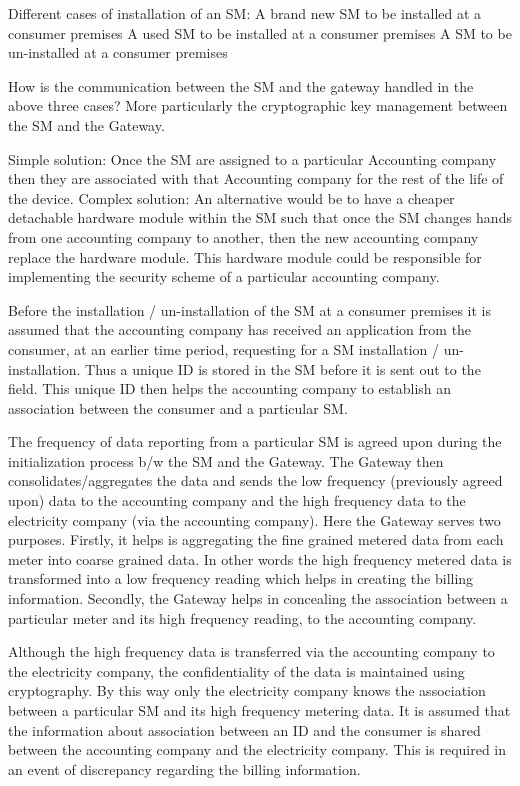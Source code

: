 Different cases of installation of an SM:
A brand new SM to be installed at a consumer premises
A used SM to be installed at a consumer premises
A SM to be un-installed at a consumer premises


How is the communication between the SM and the gateway handled in the above three cases? More particularly the cryptographic key management between the SM and the Gateway.

Simple solution: Once the SM are assigned to a particular Accounting company then they are associated with that Accounting company for the rest of the life of the device.
Complex solution: An alternative would be to have a cheaper detachable hardware module within the SM such that once the SM changes hands from one accounting company to another, then the new accounting company replace the hardware module. This hardware module could be responsible for implementing the security scheme of a particular accounting company.

Before the installation / un-installation of the SM at a consumer premises it is assumed that the accounting company has received an application from the consumer,  at an earlier time period, requesting for a SM installation / un-installation. Thus a unique ID is stored in the SM before it is sent out to the field. This unique ID then helps the accounting company to establish an association between the consumer and a particular SM.

The frequency of data reporting from a particular SM is agreed upon during the initialization process b/w the SM and the Gateway. The Gateway then consolidates/aggregates the data and sends the low frequency (previously agreed upon) data to the accounting company and the high frequency data to the electricity company (via the accounting company). Here the Gateway serves  two purposes. Firstly, it helps is aggregating the fine grained metered data from each meter into coarse grained data. In other words the high frequency metered data is transformed into a low frequency reading which helps in creating the billing information. Secondly, the Gateway helps in concealing the association between a particular meter and its high frequency reading, to the accounting company.

Although the high frequency data is transferred via the accounting company to the electricity company, the confidentiality of the data is maintained using cryptography. By this way only the electricity company knows the association between a particular SM and its high frequency metering data. It is assumed that the information about association between an ID and the consumer is shared between the accounting company and the electricity company. This is required  in an event of discrepancy regarding the billing information.

